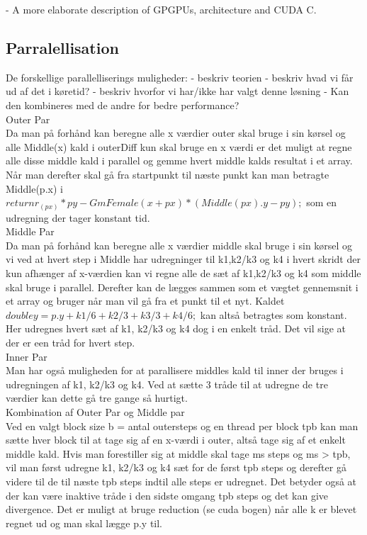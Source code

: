 		- A more elaborate description of GPGPUs, architecture and CUDA C.
		
		\subsection{Parralellisation}

De forskellige parallelliserings muligheder:
- beskriv teorien
- beskriv hvad vi får ud af det i køretid?
- beskriv hvorfor vi har/ikke har valgt denne løsning
- Kan den kombineres med de andre for bedre performance?\\

Outer Par \\
Da man på forhånd kan beregne alle x værdier outer skal bruge i sin kørsel og alle Middle(x) kald i outerDiff kun skal bruge en x værdi er det muligt at regne alle disse middle kald i parallel og gemme hvert middle kalds resultat i et array. Når man derefter skal gå fra startpunkt til næste punkt kan man betragte Middle(p.x) i $return r_(px) * py - GmFemale(x + px) * (Middle(px).y - py);$ som en udregning der tager konstant tid.\\

Middle Par\\
Da man på forhånd kan beregne alle x værdier middle skal bruge i sin kørsel og vi ved at hvert step i Middle har udregninger til k1,k2/k3 og k4 i hvert skridt der kun afhænger af x-værdien kan vi regne alle de sæt af k1,k2/k3 og k4 som middle skal bruge i parallel. Derefter kan de lægges sammen som et vægtet gennemsnit i et array og bruger når man vil gå fra et punkt til et nyt. Kaldet $double y = p.y + k1/6 + k2/3 + k3/3 + k4/6;$ kan altså betragtes som konstant. Her udregnes hvert sæt af k1, k2/k3 og k4 dog i en enkelt tråd. Det vil sige at der er een tråd for hvert step.\\

Inner Par\\
Man har også muligheden for at parallisere middles kald til inner der bruges i udregningen af k1, k2/k3 og k4. Ved at sætte 3 tråde til at udregne de tre værdier kan dette gå tre gange så hurtigt.\\

Kombination af Outer Par og Middle par\\
Ved en valgt block size b = antal outersteps og en thread per block tpb kan man sætte hver block til at tage sig af en x-værdi i outer, altså tage sig af et enkelt middle kald. Hvis man forestiller sig at middle skal tage ms steps og ms > tpb, vil man først udregne k1, k2/k3 og k4 sæt for de først tpb steps og derefter gå videre til de til næste tpb steps indtil alle steps er udregnet. Det betyder også at der kan være inaktive tråde i den sidste omgang tpb steps og det kan give divergence. Det er muligt at bruge reduction (se cuda bogen) når alle k er blevet regnet ud og man skal lægge p.y til.\\

